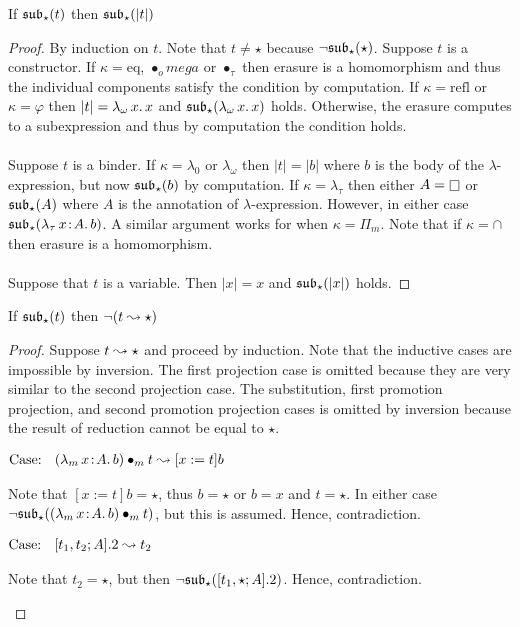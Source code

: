 \begin{lemma}
    If $\mathfrak{sub}_\star(t)$ then $\mathfrak{sub}_\star(|t|)$
    \label{lem:2:substar_erased}
\end{lemma}
\begin{proof}
    By induction on $t$.
    Note that $t \neq \star$ because $\neg \mathfrak{sub}_\star(\star)$.
    Suppose $t$ is a constructor.
    If $\kappa = \text{eq}$, $\bullet_omega$ or $\bullet_\tau$ then erasure is a homomorphism and thus the individual components satisfy the condition by computation.
    If $\kappa = \text{refl}$ or $\kappa = \varphi$ then $|t| = {\lambda_\omega}\, x.\, x$ and $\mathfrak{sub}_\star({\lambda_\omega}\, x.\, x)$ holds.
    Otherwise, the erasure computes to a subexpression and thus by computation the condition holds.
    \\ \\
    Suppose $t$ is a binder.
    If $\kappa = \lambda_0$ or $\lambda_\omega$ then $|t| = |b|$ where $b$ is the body of the $\lambda$-expression, but now $\mathfrak{sub}_\star(b)$ by computation.
    If $\kappa = \lambda_\tau$ then either $A = \kind$ or $\mathfrak{sub}_\star(A)$ where $A$ is the annotation of $\lambda$-expression.
    However, in either case $\mathfrak{sub}_\star({\lambda_\tau}\, x\! : \! A.\, b)$.
    A similar argument works for when $\kappa = \Pi_m$.
    Note that if $\kappa = \cap$ then erasure is a homomorphism.
    \\ \\
    Suppose that $t$ is a variable.
    Then $|x| = x$ and $\mathfrak{sub}_\star(|x|)$ holds.
\end{proof}

\begin{lemma}
    If $\mathfrak{sub}_\star(t)$ then $\neg (t \leadsto \star)$
    \label{lem:2:substar_not_beta_star_step}
\end{lemma}
\begin{proof}
    Suppose $t \leadsto \star$ and proceed by induction.
    Note that the inductive cases are impossible by inversion.
    The first projection case is omitted because they are very similar to the second projection case.
    The substitution, first promotion projection, and second promotion projection cases is omitted by inversion because the result of reduction cannot be equal to $\star$.

    $\text{Case: }\begin{array}{c} ({\lambda_m}\, x\! : \! A.\, b) \bullet_{m} t \leadsto [x := t]b \end{array}$
    \begin{proofcase}
        Note that $[x := t]b = \star$, thus $b = \star$ or $b = x$ and $t = \star$.
        In either case $\neg \mathfrak{sub}_\star(({\lambda_m}\, x\! : \! A.\, b) \bullet_{m} t)$, but this is assumed.
        Hence, contradiction.
    \end{proofcase}
    
    $\text{Case: }\begin{array}{c} [t_1, t_2; A].2 \leadsto t_2 \end{array}$
    \begin{proofcase}
        Note that $t_2 = \star$, but then $\neg \mathfrak{sub}_\star([t_1, \star; A].2)$.
        Hence, contradiction.
    \end{proofcase}
\end{proof}

